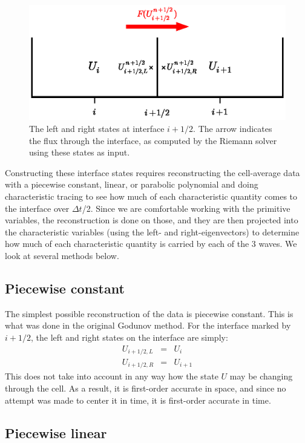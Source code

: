 \documentclass[11pt]{article}
\begin{document}
\begin{figure}[t]
\centering
\includegraphics[width=5.5in]{riemann}
\caption{\label{fig:riemann} The left and right states at interface
$i+1/2$.  The arrow indicates the flux through the interface, as computed
by the Riemann solver using these states as input.}
\end{figure}

Constructing these interface states requires reconstructing the
cell-average data with a piecewise constant, linear, or parabolic
polynomial and doing characteristic tracing to see how much of each
characteristic quantity comes to the interface over $\Delta t$/2.
Since we are comfortable working with the primitive variables, the
reconstruction is done on those, and they are then projected into the
characteristic variables (using the left- and right-eigenvectors) to
determine how much of each characteristic quantity is carried by each
of the 3 waves.  We look at several methods below.

\subsection{Piecewise constant}

The simplest possible reconstruction of the data is piecewise constant.
This is what was done in the original Godunov method.  For the interface
marked by $i+1/2$, the left and right states on the interface are simply:
\begin{eqnarray}
U_{i+1/2,L} &=& U_i \\
U_{i+1/2,R} &=& U_{i+1}
\end{eqnarray}
This does not take into account in any way how the state $U$ may be changing
through the cell.  As a result, it is first-order accurate in space, and since
no attempt was made to center it in time, it is first-order accurate in time.

\subsection{Piecewise linear}
\end{document}
